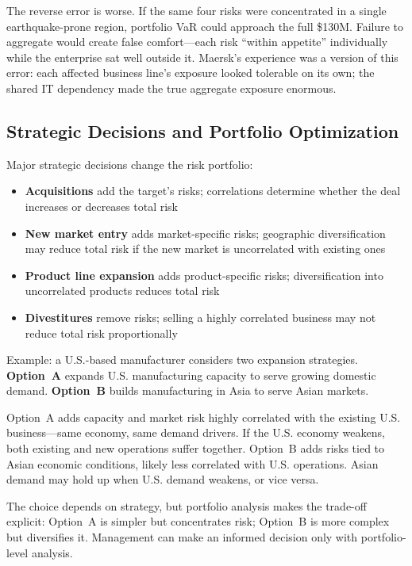 \documentclass[11pt,openany]{book}
\providecommand{\tightlist}{\setlength{\itemsep}{0pt}\setlength{\parskip}{0pt}}
\begin{document}
The reverse error is worse. If the same four risks were concentrated in a
single earthquake-prone region, portfolio VaR could approach the full \$130M.
Failure to aggregate would create false comfort---each risk ``within
appetite'' individually while the enterprise sat well outside it. Maersk's
experience was a version of this error: each affected business line's exposure
looked tolerable on its own; the shared IT dependency made the true aggregate
exposure enormous.

\subsection{Strategic Decisions and Portfolio Optimization}
\label{subsec:strategic-decisions}

Major strategic decisions change the risk portfolio:

\begin{itemize}\tightlist
  \item \textbf{Acquisitions} add the target's risks; correlations determine
        whether the deal increases or decreases total risk
  \item \textbf{New market entry} adds market-specific risks; geographic
        diversification may reduce total risk if the new market is
        uncorrelated with existing ones
  \item \textbf{Product line expansion} adds product-specific risks;
        diversification into uncorrelated products reduces total risk
  \item \textbf{Divestitures} remove risks; selling a highly correlated
        business may not reduce total risk proportionally
\end{itemize}

Example: a U.S.-based manufacturer considers two expansion strategies.
\textbf{Option~A} expands U.S. manufacturing capacity to serve growing
domestic demand. \textbf{Option~B} builds manufacturing in Asia to serve Asian
markets.

Option~A adds capacity and market risk highly correlated with the existing
U.S. business---same economy, same demand drivers. If the U.S. economy
weakens, both existing and new operations suffer together. Option~B adds risks
tied to Asian economic conditions, likely less correlated with U.S.
operations. Asian demand may hold up when U.S. demand weakens, or vice versa.

The choice depends on strategy, but portfolio analysis makes the trade-off
explicit: Option~A is simpler but concentrates risk; Option~B is more complex
but diversifies it. Management can make an informed decision only with
portfolio-level analysis.
\end{document}
